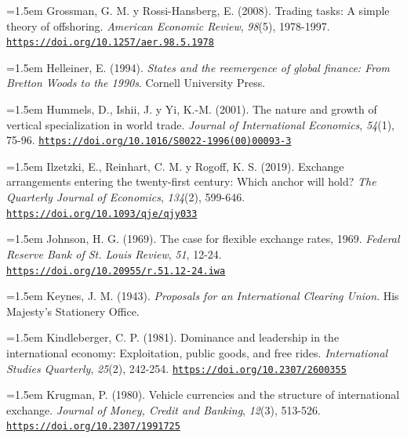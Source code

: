 \documentclass[10pt,a4paper]{article}
\begin{document}
{\sloppy\noindent\hangindent=1.5em Grossman, G. M. y Rossi-Hansberg, E. (2008). Trading tasks: A simple theory of offshoring. \textit{American Economic Review}, \textit{98}(5), 1978-1997. \href{https://doi.org/10.1257/aer.98.5.1978}{\nolinkurl{https://doi.org/10.1257/aer.98.5.1978}}\par}

{\sloppy\noindent\hangindent=1.5em Helleiner, E. (1994). \textit{States and the reemergence of global finance: From Bretton Woods to the 1990s}. Cornell University Press.\par}

{\sloppy\noindent\hangindent=1.5em Hummels, D., Ishii, J. y Yi, K.-M. (2001). The nature and growth of vertical specialization in world trade. \textit{Journal of International Economics}, \textit{54}(1), 75-96. \href{https://doi.org/10.1016/S0022-1996(00)00093-3}{\nolinkurl{https://doi.org/10.1016/S0022-1996(00)00093-3}}\par}

{\sloppy\noindent\hangindent=1.5em Ilzetzki, E., Reinhart, C. M. y Rogoff, K. S. (2019). Exchange arrangements entering the twenty-first century: Which anchor will hold? \textit{The Quarterly Journal of Economics}, \textit{134}(2), 599-646. \href{https://doi.org/10.1093/qje/qjy033}{\nolinkurl{https://doi.org/10.1093/qje/qjy033}}\par}

{\sloppy\noindent\hangindent=1.5em Johnson, H. G. (1969). The case for flexible exchange rates, 1969. \textit{Federal Reserve Bank of St. Louis Review}, \textit{51}, 12-24. \href{https://doi.org/10.20955/r.51.12-24.iwa}{\nolinkurl{https://doi.org/10.20955/r.51.12-24.iwa}}\par}

{\sloppy\noindent\hangindent=1.5em Keynes, J. M. (1943). \textit{Proposals for an International Clearing Union}. His Majesty's Stationery Office.\par}

{\sloppy\noindent\hangindent=1.5em Kindleberger, C. P. (1981). Dominance and leadership in the international economy: Exploitation, public goods, and free rides. \textit{International Studies Quarterly}, \textit{25}(2), 242-254. \href{https://doi.org/10.2307/2600355}{\nolinkurl{https://doi.org/10.2307/2600355}}\par}

{\sloppy\noindent\hangindent=1.5em Krugman, P. (1980). Vehicle currencies and the structure of international exchange. \textit{Journal of Money, Credit and Banking}, \textit{12}(3), 513-526. \href{https://doi.org/10.2307/1991725}{\nolinkurl{https://doi.org/10.2307/1991725}}\par}
\end{document}

